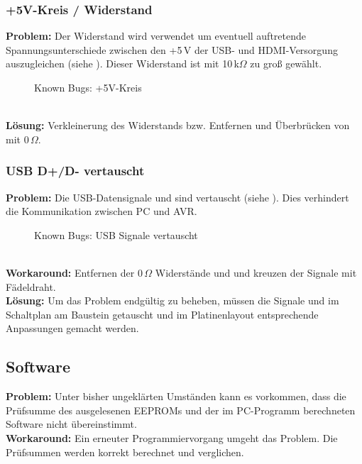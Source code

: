 \subsubsection{+5V-Kreis / Widerstand}
\textbf{Problem:} Der Widerstand  wird verwendet um eventuell auftretende Spannungsunterschiede zwischen den +5\,V der USB- und HDMI-Versorgung auszugleichen (siehe ). Dieser Widerstand ist mit 10\,k$\Omega$ zu groß gewählt.
\begin{figure}[htp]
	\center
    \caption{Known Bugs: +5V-Kreis}
    \label{fig:r13}
\end{figure}\\
\textbf{Lösung:} Verkleinerung des Widerstands bzw. Entfernen und Überbrücken von  mit 0\,$\Omega$.
\subsubsection{USB D+/D- vertauscht}
\textbf{Problem:} Die USB-Datensignale  und  sind vertauscht (siehe ). Dies verhindert die Kommunikation zwischen PC und AVR.
\begin{figure}[htp]
	\center
    \caption{Known Bugs: USB Signale vertauscht}
    \label{fig:usb_vertauscht}
\end{figure}\\
\textbf{Workaround:} Entfernen der 0\,$\Omega$ Widerstände  und  und kreuzen der Signale mit Fädeldraht.\\
\textbf{Lösung:} Um das Problem endgültig zu beheben, müssen die Signale  und  im Schaltplan am Baustein  getauscht und im Platinenlayout entsprechende Anpassungen gemacht werden.
\subsection{Software}
\textbf{Problem:} Unter bisher ungeklärten Umständen kann es vorkommen, dass die Prüfsumme des ausgelesenen EEPROMs und der im PC-Programm berechneten Software nicht übereinstimmt. \\
\textbf{Workaround:} Ein erneuter Programmiervorgang umgeht das Problem. Die Prüfsummen werden korrekt berechnet und verglichen.
